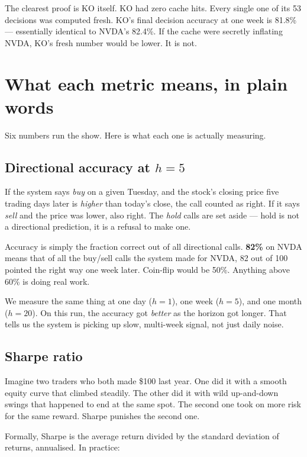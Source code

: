\documentclass[11pt,a4paper]{article}
\begin{document}
The clearest proof is KO itself. KO had zero cache hits. Every single one
of its 53 decisions was computed fresh. KO's final decision accuracy at
one week is 81.8\% --- essentially identical to NVDA's 82.4\%. If the
cache were secretly inflating NVDA, KO's fresh number would be lower.
It is not.

\section{What each metric means, in plain words}

Six numbers run the show. Here is what each one is actually measuring.

\subsection*{Directional accuracy at $h=5$}

If the system says \textit{buy} on a given Tuesday, and the stock's closing
price five trading days later is \textit{higher} than today's close, the
call counted as right. If it says \textit{sell} and the price was lower,
also right. The \textit{hold} calls are set aside --- hold is not a
directional prediction, it is a refusal to make one.

Accuracy is simply the fraction correct out of all directional calls.
\textbf{82\%} on NVDA means that of all the buy/sell calls the system
made for NVDA, 82 out of 100 pointed the right way one week later.
Coin-flip would be 50\%. Anything above 60\% is doing real work.

We measure the same thing at one day ($h=1$), one week ($h=5$), and one
month ($h=20$). On this run, the accuracy got \textit{better} as the
horizon got longer. That tells us the system is picking up slow,
multi-week signal, not just daily noise.

\subsection*{Sharpe ratio}

Imagine two traders who both made \$100 last year. One did it with a
smooth equity curve that climbed steadily. The other did it with wild
up-and-down swings that happened to end at the same spot. The second one
took on more risk for the same reward. Sharpe punishes the second one.

Formally, Sharpe is the average return divided by the standard deviation
of returns, annualised. In practice:
\end{document}
